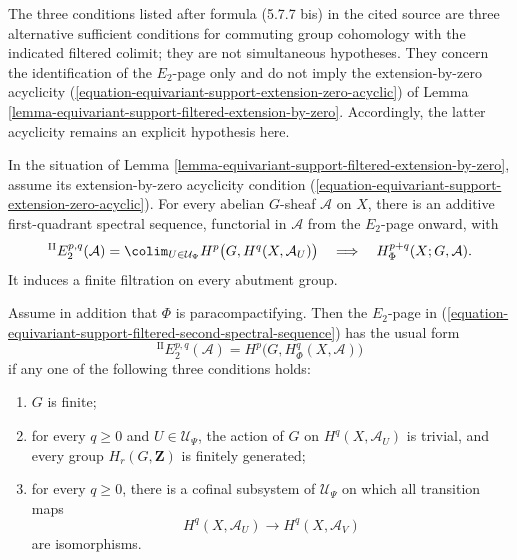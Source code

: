 \begin{lemma}
\label{lemma-equivariant-support-filtered-second-spectral-sequence}
\begin{reference}
\cite[Chapter V, \S 5.7, formulae (5.7.7) and (5.7.7 bis),
p. 220]{Tohoku}
\end{reference}
\begin{history}
The three conditions listed after formula (5.7.7 bis) in the cited source
are three alternative sufficient conditions for commuting group cohomology
with the indicated filtered colimit; they are not simultaneous hypotheses.
They concern the identification of the $E_2$-page only and do not imply the
extension-by-zero acyclicity
(\ref{equation-equivariant-support-extension-zero-acyclic}) of Lemma
\ref{lemma-equivariant-support-filtered-extension-by-zero}. Accordingly,
the latter acyclicity remains an explicit hypothesis here.
\end{history}
In the situation of Lemma
\ref{lemma-equivariant-support-filtered-extension-by-zero}, assume its
extension-by-zero acyclicity condition
(\ref{equation-equivariant-support-extension-zero-acyclic}). For every
abelian $G$-sheaf $\mathcal A$ on $X$, there is an additive first-quadrant
spectral sequence,
functorial in $\mathcal A$ from the $E_2$-page onward, with
\begin{equation}
\label{equation-equivariant-support-filtered-second-spectral-sequence}
{}^{\mathrm {II}}E_2^{p,q}(\mathcal A)
=
\colim_{U\in\mathcal U_\Psi}
H^p\bigl(G,H^q(X,\mathcal A_U)\bigr)
\quad\Longrightarrow\quad
H^{p+q}_\Phi(X;G,\mathcal A).
\end{equation}
It induces a finite filtration on every abutment group.

Assume in addition that $\Phi$ is paracompactifying. Then the $E_2$-page
in
(\ref{equation-equivariant-support-filtered-second-spectral-sequence}) has
the usual form
\begin{equation}
\label{equation-equivariant-support-usual-second-page}
{}^{\mathrm {II}}E_2^{p,q}(\mathcal A)
=
H^p\bigl(G,H^q_\Phi(X,\mathcal A)\bigr)
\end{equation}
if any one of the following three conditions holds:
\begin{enumerate}
\item $G$ is finite;
\item for every $q\geq 0$ and $U\in\mathcal U_\Psi$, the action of $G$
on $H^q(X,\mathcal A_U)$ is trivial, and every group
$H_r(G,\mathbf Z)$ is finitely generated;
\item for every $q\geq 0$, there is a cofinal subsystem of
$\mathcal U_\Psi$ on which all transition maps
$$
H^q(X,\mathcal A_U)\longrightarrow H^q(X,\mathcal A_V)
$$
are isomorphisms.
\end{enumerate}
\end{lemma}

